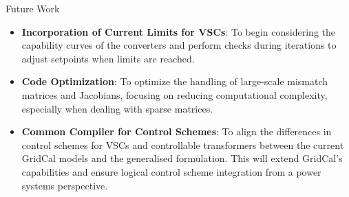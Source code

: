 \begin{frame}{Future Work}

    \begin{itemize}
        \item \textbf{Incorporation of Current Limits for VSCs}: 
        To begin considering the capability curves of the converters and perform checks during iterations to adjust setpoints when limits are reached.

        \item \textbf{Code Optimization}: 
        To optimize the handling of large-scale mismatch matrices and Jacobians, focusing on reducing computational complexity, especially when dealing with sparse matrices.

        \item \textbf{Common Compiler for Control Schemes}: 
        To align the differences in control schemes for VSCs and controllable transformers between the current GridCal models and the generalised formulation. This will extend GridCal’s capabilities and ensure logical control scheme integration from a power systems perspective.

    \end{itemize}

\end{frame}


